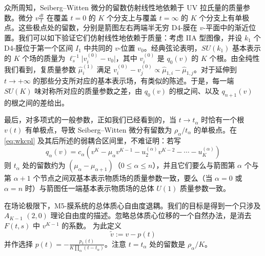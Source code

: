众所周知，Seiberg–Witten 微分的留数仿射线性地依赖于 UV 拉氏量的质量参数。微分 $v \frac{dt}{t}$ 在覆盖 $t=0$ 的 $K$ 个分支上与覆盖 $t=\infty$ 的 $K$ 个分支上有单极点。这些极点处的留数，分别是箭图左右两端半无穷 D4-膜在 $v$-平面中的渐近位置。我们可以如下验证它们仿射线性地依赖于质量：考虑 IIA 型图像，并设 $k_1$ 个 D4-膜位于第一个区间 $I_1$ 中共同的 $v$-位置 $v_0$。经典弦论表明，$SU(k_1)$ 基本表示的 $K$ 个场的质量为 $\ell_s^{-1}\vert v_i^{(0)} - v_0\vert $，其中 $v_i^{(0)}$ 是 $q_0(v)$ 的 $K$ 个根。由全纯性我们看到，复质量参数 $\hat \mu^{(1)}_i$ 满足 $ v_i^{(0)} - v_j^{(0)} \propto \hat \mu_{1,i} - \hat \mu_{1,j} $。对于延伸到 $t\to +\infty$ 的那些分支所对应的基本表示场，有类似的陈述。于是，每一端 $SU(K)$ 味对称所对应的质量参数之差，由 $q_0(v)$ 的根之间、以及 $q_{n+1}(v)$ 的根之间的差给出。

最后，对多项式的一般参数，正如我们已经看到的，当 $t\to t_\alpha$ 时恰有一个根 $v(t)$ 有单极点，导致 Seiberg–Witten 微分有留数为 $\rho_\alpha/t_\alpha$ 的单极点。在 \eqref{eq:wkcpl} 及其后所述的弱耦合区间里，不难证明：若写
\begin{equation}\label{eq:Paramqalpha}
q_{\alpha}(v) = c_\alpha (v^K- \mu_\alpha v^{K-1} - u_2^{(\alpha)} v^{K-2} - \cdots
- u_K^{(\alpha)} )
\end{equation}
则 $t_\alpha$ 处的留数约为 $(\mu_\alpha - \mu_{\alpha+1})$（$0\leq \alpha \leq n$），并且它们要么与箭图第 $\alpha$ 个与第 $\alpha+1$ 个节点之间双基本表示物质场的质量参数一致，要么（当 $\alpha=0$ 或 $\alpha=n$ 时）与箭图任一端基本表示物质场的总体 $U(1)$ 质量参数一致。

在场论极限下，M5-膜系统的总体质心自由度退耦。我们的目标是得到一个只涉及 $A_{K-1}$ $(2,0)$ 理论自由度的描述。忽略总体质心位移的一个自然办法，是消去 $F(t,s)$ 中 $v^{K-1}$ 的系数。%
为此定义
\begin{equation}
\label{eq:tilde-v}
\tilde v := v - p(t)
\end{equation}
并作选择 $p(t) = -\frac{p_1(t)}{K\prod_\alpha (t-t_\alpha)}$。注意 $t=t_\alpha$ 处的留数是 $\rho_\alpha/K$。

